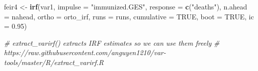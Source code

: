 \documentclass[
]{article}
\newenvironment{Shaded}{\begin{snugshade}}{\end{snugshade}}
\newcommand{\AttributeTok}[1]{\textcolor[rgb]{0.13,0.29,0.53}{#1}}
\newcommand{\CommentTok}[1]{\textcolor[rgb]{0.56,0.35,0.01}{\textit{#1}}}
\newcommand{\ConstantTok}[1]{\textcolor[rgb]{0.56,0.35,0.01}{#1}}
\newcommand{\FloatTok}[1]{\textcolor[rgb]{0.00,0.00,0.81}{#1}}
\newcommand{\FunctionTok}[1]{\textcolor[rgb]{0.13,0.29,0.53}{\textbf{#1}}}
\newcommand{\NormalTok}[1]{#1}
\newcommand{\OtherTok}[1]{\textcolor[rgb]{0.56,0.35,0.01}{#1}}
\newcommand{\StringTok}[1]{\textcolor[rgb]{0.31,0.60,0.02}{#1}}
\renewenvironment{Shaded}{\begin{mdframed}[ backgroundcolor=shadecolor, linecolor = shadecolor, leftmargin=\dimexpr\leftmargin-2pt\relax, innerleftmargin=1.6pt, innertopmargin=5pt, skipabove=10pt,skipbelow=3pt ]}{\end{mdframed}}
\begin{document}
\begin{Shaded}
\begin{Highlighting}[]
\NormalTok{feir4 }\OtherTok{\textless{}{-}} \FunctionTok{irf}\NormalTok{(var1,}
             \AttributeTok{impulse =} \StringTok{"immunized.GES"}\NormalTok{,}
             \AttributeTok{response =} \FunctionTok{c}\NormalTok{(}\StringTok{"deaths"}\NormalTok{),}
             \AttributeTok{n.ahead =}\NormalTok{ nahead,}
             \AttributeTok{ortho =}\NormalTok{ orto\_irf,}
             \AttributeTok{runs =}\NormalTok{ runs,}
             \AttributeTok{cumulative =} \ConstantTok{TRUE}\NormalTok{,}
             \AttributeTok{boot =} \ConstantTok{TRUE}\NormalTok{,}
             \AttributeTok{ic =} \FloatTok{0.95}\NormalTok{)}

\CommentTok{\# extract\_varirf() extracts IRF estimates so we can use them freely}
\CommentTok{\# https://raw.githubusercontent.com/anguyen1210/var{-}tools/master/R/extract\_varirf.R}


\end{Highlighting}
\end{Shaded}
\end{document}
